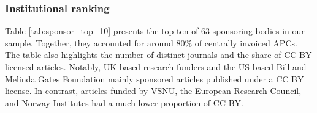 \documentclass[a4paper,man,floatsintext,longtable,noextraspace,12pt]{apa6}
\begin{document}
\hypertarget{institutional-ranking}{%
\subsubsection*{Institutional ranking}\label{institutional-ranking}}

Table \ref{tab:sponsor_top_10} presents the top ten of 63 sponsoring
bodies in our sample. Together, they accounted for around 80\% of
centrally invoiced APCs. The table also highlights the number of
distinct journals and the share of CC BY licensed articles. Notably,
UK-based research funders and the US-based Bill and Melinda Gates
Foundation mainly sponsored articles published under a CC BY license. In
contrast, articles funded by VSNU, the European Research Council, and
Norway Institutes had a much lower proportion of CC BY.
\end{document}
